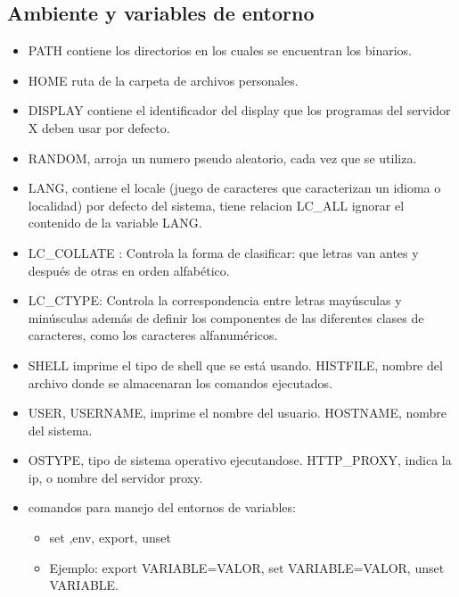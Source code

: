 \documentclass{beamer}
\begin{document}
\subsection{Ambiente y variables de entorno}
\begin{frame}
	\begin{itemize}
		\item PATH contiene los directorios en los cuales se encuentran los binarios.
		\item HOME ruta de la carpeta de archivos personales.
		\item DISPLAY contiene el identificador del display que los programas del servidor X deben usar por defecto.
		\item RANDOM, arroja un numero pseudo aleatorio, cada vez que se utiliza.
		\item LANG, contiene el locale (juego de caracteres que caracterizan un idioma o localidad) por defecto del sistema, tiene relacion LC\_ALL  ignorar el contenido de la variable LANG.
	\end{itemize}
\end{frame} 

\begin{frame}
	\begin{itemize}
		\item LC\_COLLATE : Controla la forma de clasificar: que letras van antes y despu\'es de otras en orden alfab\'etico.
		\item LC\_CTYPE: Controla la correspondencia entre letras may\'usculas y min\'usculas adem\'as de definir los componentes de las diferentes clases de caracteres, como los caracteres alfanum\'ericos. 
		\item SHELL imprime el tipo de shell que se est\'a usando. HISTFILE, nombre del archivo donde se almacenaran los comandos ejecutados.
		\item USER, USERNAME, imprime el nombre del usuario. HOSTNAME, nombre del sistema.
		\item OSTYPE, tipo de sistema operativo ejecutandose. HTTP\_PROXY, indica la ip, o nombre del servidor proxy.
		\item comandos para manejo del entornos de variables:
		\begin{itemize}
		\item set ,env,  export, unset
		\item Ejemplo:  export VARIABLE=VALOR, set VARIABLE=VALOR, unset VARIABLE.
		\end{itemize}
	\end{itemize}
\end{frame}
\end{document}
